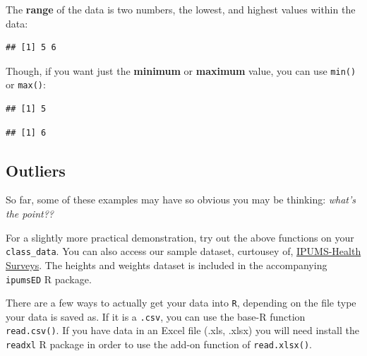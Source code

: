 \documentclass[
]{book}
\newenvironment{Shaded}{\begin{snugshade}}{\end{snugshade}}
\newcommand{\FunctionTok}[1]{\textcolor[rgb]{0.13,0.29,0.53}{\textbf{#1}}}
\newcommand{\NormalTok}[1]{#1}
\newcommand{\SpecialCharTok}[1]{\textcolor[rgb]{0.81,0.36,0.00}{\textbf{#1}}}
\begin{document}
The \textbf{range} of the data is two numbers, the lowest, and highest values within the data:

\begin{Shaded}
\end{Shaded}

\begin{verbatim}
## [1] 5 6
\end{verbatim}

Though, if you want just the \textbf{minimum} or \textbf{maximum} value, you can use \texttt{min()} or \texttt{max()}:

\begin{Shaded}
\end{Shaded}

\begin{verbatim}
## [1] 5
\end{verbatim}

\begin{Shaded}
\end{Shaded}

\begin{verbatim}
## [1] 6
\end{verbatim}

\hypertarget{outliers}{%
\subsection{Outliers}\label{outliers}}

So far, some of these examples may have so obvious you may be thinking: \emph{what's the point??}

For a slightly more practical demonstration, try out the above functions on your \texttt{class\_data}. You can also access our sample dataset, curtousey of, \href{nhis.ipums.org}{IPUMS-Health Surveys}. The heights and weights dataset is included in the accompanying \texttt{ipumsED} R package.

There are a few ways to actually get your data into \texttt{R}, depending on the file type your data is saved as. If it is a \texttt{.csv}, you can use the base-R function \texttt{read.csv()}. If you have data in an Excel file (.xls, .xlsx) you will need install the \texttt{readxl} R package in order to use the add-on function of \texttt{read.xlsx()}.
\end{document}
